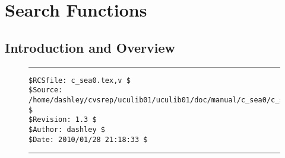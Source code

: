 
\chapter{Search Functions}

\label{csea0}

\section{Introduction and Overview}
\label{csea0:siov0}



\noindent\begin{figure}[!b]
\noindent\rule[-0.25in]{\textwidth}{1pt}
\begin{tiny}
\begin{verbatim}
$RCSfile: c_sea0.tex,v $
$Source: /home/dashley/cvsrep/uculib01/uculib01/doc/manual/c_sea0/c_sea0.tex,v $
$Revision: 1.3 $
$Author: dashley $
$Date: 2010/01/28 21:18:33 $
\end{verbatim}
\end{tiny}
\noindent\rule[0.25in]{\textwidth}{1pt}
\end{figure}

%
%
%

